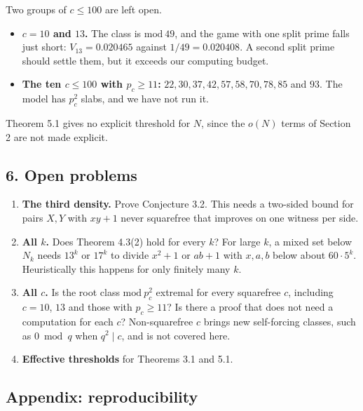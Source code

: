 \documentclass[
  11pt,
]{article}
\providecommand{\tightlist}{%
  \setlength{\itemsep}{0pt}\setlength{\parskip}{0pt}}
\begin{document}
Two groups of \(c \le 100\) are left open.

\begin{itemize}
\tightlist
\item
  \textbf{\(c = 10\) and \(13\).} The class is \(\mathrm{mod}\ 49\), and
  the game with one split prime falls just short: \(V_{13} = 0.020465\)
  against \(1/49 = 0.020408\). A second split prime should settle them,
  but it exceeds our computing budget.
\item
  \textbf{The ten \(c \le 100\) with \(p_c \ge 11\):}
  \(22, 30, 37, 42, 57, 58, 70, 78, 85\) and \(93\). The model has
  \(p_c^2\) slabs, and we have not run it.
\end{itemize}

Theorem 5.1 gives no explicit threshold for \(N\), since the \(o(N)\)
terms of Section 2 are not made explicit.

\subsection{6. Open problems}

\begin{enumerate}
\def\labelenumi{\arabic{enumi}.}
\tightlist
\item
  \textbf{The third density.} Prove Conjecture 3.2. This needs a
  two-sided bound for pairs \(X, Y\) with \(xy + 1\) never squarefree
  that improves on one witness per side.
\item
  \textbf{All \(k\).} Does Theorem 4.3(2) hold for every \(k\)? For
  large \(k\), a mixed set below \(N_k\) needs \(13^k\) or \(17^k\) to
  divide \(x^2 + 1\) or \(ab + 1\) with \(x, a, b\) below about
  \(60\cdot 5^k\). Heuristically this happens for only finitely many
  \(k\).
\item
  \textbf{All \(c\).} Is the root class \(\mathrm{mod}\ p_c^2\) extremal
  for every squarefree \(c\), including \(c = 10\), \(13\) and those
  with \(p_c \ge 11\)? Is there a proof that does not need a computation
  for each \(c\)? Non-squarefree \(c\) brings new self-forcing classes,
  such as \(0 \bmod q\) when \(q^2 \mid c\), and is not covered here.
\item
  \textbf{Effective thresholds} for Theorems 3.1 and 5.1.
\end{enumerate}

\subsection{Appendix: reproducibility}
\end{document}
